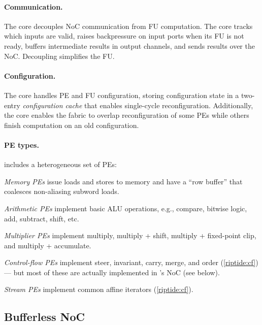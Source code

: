\paragraph{Communication.}
The \textmu core decouples NoC communication from FU computation.
% 
The \textmu core tracks which inputs are valid, raises backpressure on
input ports when its FU is not ready, buffers intermediate results in
output channels, and sends results over the NoC.
%
Decoupling simplifies the FU.

\paragraph{Configuration.}
The \textmu core handles PE and FU configuration, storing configuration state in a
two-entry {\em configuration cache} that enables single-cycle reconfiguration. 
% 
Additionally, the \textmu core enables the fabric to overlap
reconfiguration of some PEs while others
finish computation on an old configuration.

\paragraph{PE types.}
\riptide includes a heterogeneous set of PEs:
\begin{compactitem}
\item \emph{Memory PEs} issue loads and stores to memory and have a ``row buffer'' that coalesces non-aliasing subword loads.

\item \emph{Arithmetic PEs} implement basic ALU operations, e.g., compare, bitwise logic, add, subtract, shift, etc.

\item \emph{Multiplier PEs} implement multiply, multiply + shift, multiply + fixed-point clip, and multiply + accumulate.

\item \emph{Control-flow PEs} implement steer, invariant, carry, %
  merge, and order (\autoref{riptide:cf}) ---
%
but most of these are actually implemented in \riptide's NoC (see below).

\item \emph{Stream PEs} implement common affine iterators (\autoref{riptide:cf}).
\end{compactitem}

\subsection{Bufferless NoC}
\label{arch:noc}

